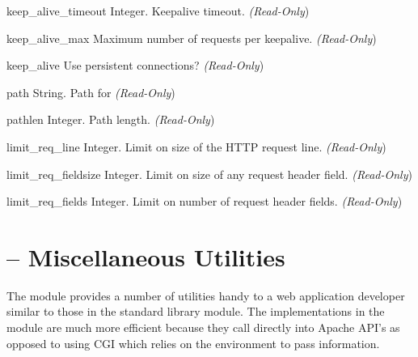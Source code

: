 \begin{memberdesc}[server]{keep_alive_timeout}
  Integer. Keepalive timeout.
  \emph{(Read-Only})
\end{memberdesc}

\begin{memberdesc}[server]{keep_alive_max}
  Maximum number of requests per keepalive.
  \emph{(Read-Only})
\end{memberdesc}

\begin{memberdesc}[server]{keep_alive}
  Use persistent connections?
  \emph{(Read-Only})
\end{memberdesc}

\begin{memberdesc}[server]{path}
  String. Path for 
  \emph{(Read-Only})
\end{memberdesc}

\begin{memberdesc}[server]{pathlen}
  Integer. Path length.
  \emph{(Read-Only})
\end{memberdesc}

\begin{memberdesc}[server]{limit_req_line}
  Integer. Limit on size of the HTTP request line.
  \emph{(Read-Only})
\end{memberdesc}

\begin{memberdesc}[server]{limit_req_fieldsize}
  Integer. Limit on size of any request header field.
  \emph{(Read-Only})
\end{memberdesc}

\begin{memberdesc}[server]{limit_req_fields}
  Integer. Limit on number of request header fields.
  \emph{(Read-Only})
\end{memberdesc}

\section{ -- Miscellaneous Utilities\label{pyapi-util}}

The  module provides a number of utilities handy to a web
application developer similar to those in the standard library
 module. The implementations in the  module
are much more efficient because they call directly into Apache API's
as opposed to using CGI which relies on the environment to pass
information.

